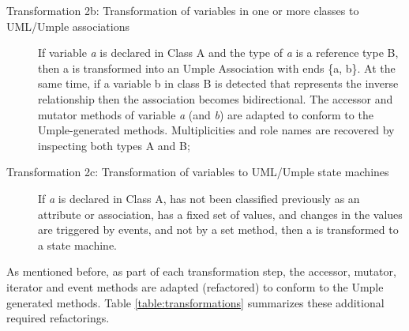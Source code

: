 \begin{description}
\begin{description}
	\item [Transformation 2b: Transformation of variables in one or more classes to UML/Umple associations]
	If variable \textit{a} is declared in Class A and the type of \textit{a} is a reference type B, then a is transformed into an Umple Association with ends \{a, b\}. At the same time, if a variable b in class B is detected that represents the inverse relationship then the association becomes bidirectional. The accessor and mutator methods of variable \textit{a} (and \textit{b}) are adapted to conform to the Umple-generated methods. Multiplicities and role names are recovered by inspecting both types A and B;

	\item [Transformation 2c: Transformation of variables to UML/Umple state machines]
	If \textit{a} is declared in Class A, has not been classified previously as an attribute or association, has a fixed set of values, and changes in the values are triggered by events, and not by a set method, then a is transformed to a state machine.	
\end{description}
\end{description}

As mentioned before, as part of each transformation step, the accessor, mutator, iterator and event methods are adapted (refactored) to conform to the Umple generated methods. Table \ref{table:transformations} summarizes these additional required refactorings. 

